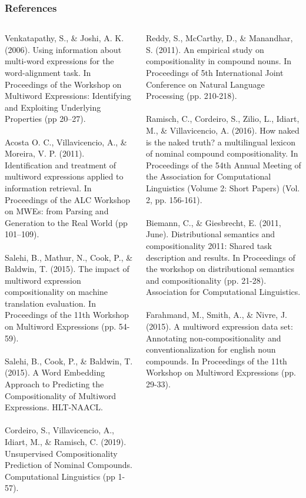 \documentclass[english,svgnames,notes=hide,14pt,aspectratio=169]{beamer}
\begin{document}
\begin{frame}
\frametitle{References}
\tiny
\begin{columns}[T] %
\begin{column}{.48\textwidth}
Venkatapathy, S., \& Joshi, A. K. (2006). Using information about multi-word expressions for the word-alignment task. In Proceedings of the Workshop on Multiword Expressions: Identifying and Exploiting Underlying Properties (pp 20--27).\\~\\
Acosta O. C., Villavicencio, A., \& Moreira, V. P. (2011). Identification and treatment of multiword expressions applied to information retrieval. In Proceedings of the ALC Workshop on MWEs: from Parsing and Generation to the Real World (pp 101--109).\\~\\
Salehi, B., Mathur, N., Cook, P., \& Baldwin, T. (2015). The impact of multiword expression compositionality on machine translation evaluation. In Proceedings of the 11th Workshop on Multiword Expressions (pp. 54-59).\\~\\
Salehi, B., Cook, P., \& Baldwin, T. (2015). A Word Embedding Approach to Predicting the Compositionality of Multiword Expressions. HLT-NAACL. \\~\\
Cordeiro, S., Villavicencio, A., Idiart, M., \& Ramisch, C. (2019). Unsupervised Compositionality Prediction of Nominal Compounds. Computational Linguistics (pp 1-57).
\end{column}%
\hfill%
\begin{column}{.48\textwidth}
Reddy, S., McCarthy, D., \& Manandhar, S. (2011). An empirical study on compositionality in compound nouns. In Proceedings of 5th International Joint Conference on Natural Language Processing (pp. 210-218).\\~\\
Ramisch, C., Cordeiro, S., Zilio, L., Idiart, M., \& Villavicencio, A. (2016). How naked is the naked truth? a multilingual lexicon of nominal compound compositionality. In Proceedings of the 54th Annual Meeting of the Association for Computational Linguistics (Volume 2: Short Papers) (Vol. 2, pp. 156-161).\\~\\
Biemann, C., \& Giesbrecht, E. (2011, June). Distributional semantics and compositionality 2011: Shared task description and results. In Proceedings of the workshop on distributional semantics and compositionality (pp. 21-28). Association for Computational Linguistics.\\~\\
Farahmand, M., Smith, A., \& Nivre, J. (2015). A multiword expression data set: Annotating non-compositionality and conventionalization for english noun compounds. In Proceedings of the 11th Workshop on Multiword Expressions (pp. 29-33).
\end{column}%
\end{columns}
\end{frame}

\end{document}
